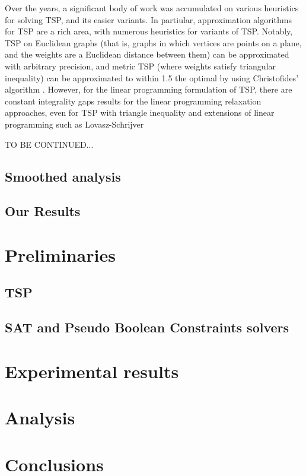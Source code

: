 \documentclass{llncs}
\begin{document}
Over the years, a significant body of work was accumulated on various heuristics for solving TSP, and its easier variants. In partiular, approximation algorithms for TSP are a rich area, with numerous heuristics for variants of TSP.  Notably, TSP on Euclidean graphs (that is, graphs in which vertices are points on a plane, and the weights are a Euclidean distance between them) can be approximated with arbitrary precision, and metric TSP (where weights satisfy triangular inequality) can be approximated to within 1.5 the optimal by using Christofides' algorithm \cite{christofides}.  However, for the linear programming formulation of TSP, there are constant integrality gaps results for the  linear programming relaxation approaches, even for TSP with triangle inequality \cite{Wat11} and extensions of linear programming such as Lovasz-Schrijver   

TO BE CONTINUED... 
\subsection{Smoothed analysis} 
\subsection{Our Results} 

\section{Preliminaries} 
\subsection{TSP} 

\subsection{SAT and  Pseudo Boolean Constraints solvers} 


\section{Experimental results} 

\section{Analysis}

\section{Conclusions}




\end{document}
